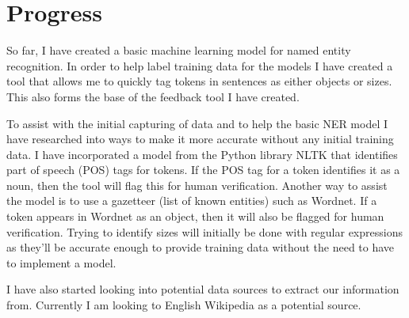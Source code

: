 \chapter{Progress}

So far, I have created a basic machine learning model for named entity recognition. In order to help label training data for the models I have created a tool that allows me to quickly tag tokens in sentences as either objects or sizes. This also forms the base of the feedback tool I have created.

To assist with the initial capturing of data and to help the basic NER model I have researched into ways to make it more accurate without any initial training data. I have incorporated a model from the Python library NLTK that identifies part of speech (POS) tags for tokens. If the POS tag for a token identifies it as a noun, then the tool will flag this for human verification. Another way to assist the model is to use a gazetteer (list of known entities) such as Wordnet. If a token appears in Wordnet as an object, then it will also be flagged for human verification. Trying to identify sizes will initially be done with regular expressions as they’ll be accurate enough to provide training data without the need to have to implement a model. 

I have also started looking into potential data sources to extract our information from. Currently I am looking to English Wikipedia as a potential source.

